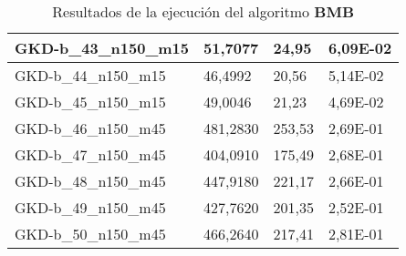 \begin{table}[!ht]
\begin{adjustbox}{height=12cm}
\begin{tabular}{|l|l|l|l|}
        GKD-b\_43\_n150\_m15 & 51,7077  & 24,95         & 6,09E-02 \\ \hline
        GKD-b\_44\_n150\_m15 & 46,4992  & 20,56         & 5,14E-02 \\ \hline
        GKD-b\_45\_n150\_m15 & 49,0046  & 21,23         & 4,69E-02 \\ \hline
        GKD-b\_46\_n150\_m45 & 481,2830 & 253,53        & 2,69E-01 \\ \hline
        GKD-b\_47\_n150\_m45 & 404,0910 & 175,49        & 2,68E-01 \\ \hline
        GKD-b\_48\_n150\_m45 & 447,9180 & 221,17        & 2,66E-01 \\ \hline
        GKD-b\_49\_n150\_m45 & 427,7620 & 201,35        & 2,52E-01 \\ \hline
        GKD-b\_50\_n150\_m45 & 466,2640 & 217,41        & 2,81E-01 \\ \hline
    \end{tabular}
    \end{adjustbox}
    \caption{Resultados de la ejecución del algoritmo \textbf{BMB}}
\end{table}

\pagebreak